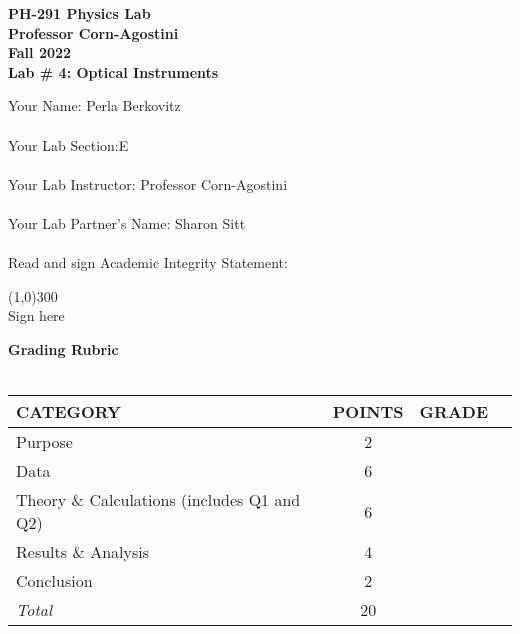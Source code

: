 

\begin{titlepage}

        \begin{center}
        \textbf{\huge PH-291 Physics Lab} \\ 
        \textbf{\Large Professor Corn-Agostini} \\ 
        \textbf{\Large Fall 2022} \\ 
        \vspace*{.5cm}  
        \textbf{\large Lab \# 4: Optical Instruments}
        \vspace{0.5cm}
        \end{center}
       
\noindent Your Name: Perla Berkovitz\\ \\
\noindent Your Lab Section:E\\ \\
\noindent Your Lab Instructor: Professor Corn-Agostini\\ \\
\noindent Your Lab Partner's Name: Sharon Sitt\\ \\
\noindent Read and sign Academic Integrity Statement:\\


    \begin{center}
    \line(1,0){300} \\
    Sign here
    \end{center}

\noindent\textbf{\large Grading Rubric} \\ \\
\renewcommand{\arraystretch}{1.5}
\begin{tabular}{|l|c|r|l|} \hline
 {\bf CATEGORY} & {\bf POINTS} & {\bf GRADE}\\\hline 
Purpose & 2 & \\\hline
Data & 6 & \\\hline
Theory \& Calculations (includes Q1 and Q2) & 6 & \\\hline 
Results \& Analysis & 4 & \\\hline 
Conclusion  & 2 & \\\hline \hline 
{\em Total} & 20 & \\ \hline
\end{tabular}

\end{titlepage} 


